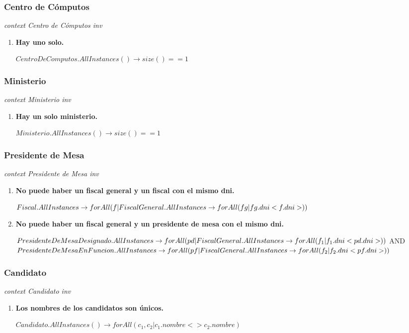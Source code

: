 \subsubsection*{Centro de C\'omputos}

\textit{context Centro de C\'omputos
inv}

\begin{enumerate}
\item \textbf{Hay uno solo.}

$CentroDeComputos.AllInstances() \rightarrow size()==1$
\end{enumerate}


\subsubsection*{Ministerio}

\textit{context Ministerio
inv}

\begin{enumerate}
\item \textbf{Hay un solo ministerio.}

$Ministerio.AllInstances() \rightarrow size()==1$

\end{enumerate}

\subsubsection*{Presidente de Mesa}

\textit{context Presidente de Mesa
inv}

\begin{enumerate}


\item \textbf{No puede haber un fiscal general y un fiscal con el mismo dni.}

$Fiscal.AllInstances \rightarrow \\
 forAll(f | FiscalGeneral.AllInstances \rightarrow forAll(fg | fg.dni <f.dni>))$

\item \textbf{No puede haber un fiscal general y un presidente de mesa con el mismo dni.}

$PresidenteDeMesaDesignado.AllInstances \rightarrow \\
 forAll(pd | FiscalGeneral.AllInstances \rightarrow forAll(f_1 | f_1.dni <pd.dni>)) \\ $
 AND $\\
 PresidenteDeMesaEnFuncion.AllInstances \rightarrow \\
 forAll(pf | FiscalGeneral.AllInstances \rightarrow forAll(f_2 | f_2.dni <pf.dni>))$
 
\end{enumerate}

\subsubsection*{Candidato}

\textit{context Candidato
inv}

\begin{enumerate}
\item \textbf{Los nombres de los candidatos son únicos.}

$Candidato.AllInstances() \rightarrow forAll(c_1, c_2 | c_1.nombre <>c_2.nombre)$

\end{enumerate}
